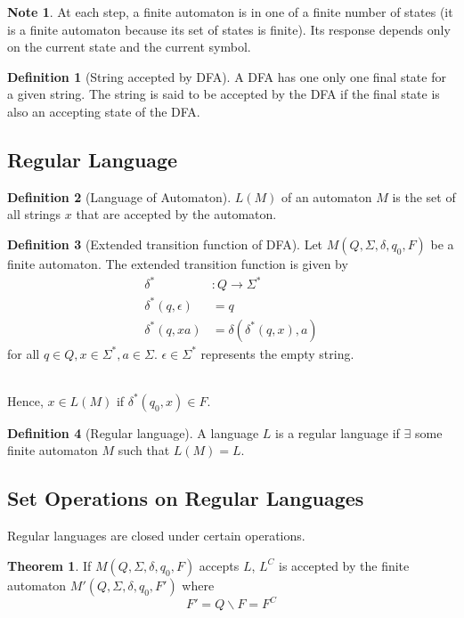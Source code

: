 \documentclass[10pt, a4paper]{extarticle}
\theoremstyle{definition}
\newtheorem{thm}{Theorem}
\newtheorem{defn}{Definition}
\newtheorem*{note*}{Note}
\begin{document}
\begin{note*}
	At each step, a finite automaton is in one of a finite number of states (it is a finite automaton because its set of states is finite). Its response depends only on the current state and the current symbol.
\end{note*}

\begin{defn}[String accepted by DFA]
	A DFA has one only one final state for a given string. The string is said to be accepted by the DFA if the final state is also an accepting state of the DFA.
\end{defn}
\subsection{Regular Language}
\begin{defn}[Language of Automaton]
	$L(M)$ of an automaton $M$ is the set of all strings $x$ that are accepted by the automaton.
\end{defn}

\begin{defn}[Extended transition function of DFA]
	Let $M(Q,\Sigma,\delta,q_0,F)$ be a finite automaton. The extended transition function is given by
	\begin{align*}
		\delta^*             & :Q\to\Sigma^*            \\
		\delta^*(q,\epsilon) & =q                       \\
		\delta^*(q,xa)       & =\delta(\delta^*(q,x),a)
	\end{align*}
	for all $q\in Q, x\in\Sigma^*, a\in\Sigma$. $\epsilon\in\Sigma^*$ represents the empty string.
\end{defn}
\hfill\\
Hence, $x\in L(M)$ if $\delta^*(q_0,x)\in F$.

\begin{defn}[Regular language]
	A language $L$ is a regular language if $\exists$ some finite automaton $M$ such that $L(M)=L$.
\end{defn}

\subsection{Set Operations on Regular Languages}
Regular languages are closed under certain operations.

\begin{thm}
	If $M(Q,\Sigma,\delta,q_0,F)$ accepts $L$, $L^C$ is accepted by the finite automaton $M'(Q,\Sigma,\delta,q_0,F')$ where \[F'=Q\backslash F=F^C\]
\end{thm}
\end{document}
